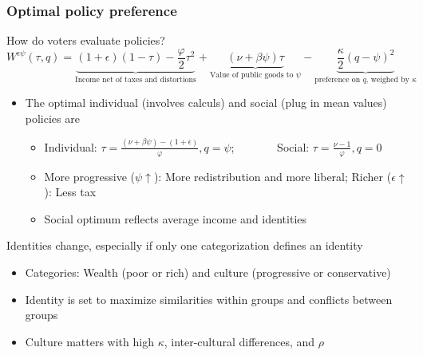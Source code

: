 \documentclass[aspectratio=169]{beamer}
\begin{document}
\begin{frame}
\frametitle{Optimal policy preference} 

How do voters evaluate policies?
\[
W^{\epsilon\psi}(\tau,q)=\underbrace{(1+\epsilon)(1-\tau)-\frac{\varphi}{2}\tau^2}_{\text{Income net of taxes and distortions}}+\underbrace{(\nu+\beta\psi)\tau}_{\text{Value of public goods to $\psi$}}-\underbrace{\frac{\kappa}{2}(q-\psi)^2}_{\text{preference on $q$, weighed by $\kappa$}}
\]
\begin{itemize}\setlength\itemsep{3pt}
\item The optimal individual (involves calculs) and social (plug in mean values) policies are 
\begin{itemize}\setlength\itemsep{3pt}
\item Individual: $\tau=\frac{(\nu+\beta\psi)-(1+\epsilon)}{\varphi}, q=\psi$; \ \ \ \  \ \ \    Social: $\tau=\frac{\nu-1}{\varphi}, q=0$
\item More progressive ($\psi\uparrow$): More redistribution and more liberal; Richer ($\epsilon\uparrow$): Less tax
\item Social optimum reflects average income and identities
\end{itemize}
\end{itemize}\medskip
Identities change, especially if only one categorization defines an identity
\begin{itemize}\setlength\itemsep{3pt}
\item Categories: Wealth (poor or rich) and culture (progressive or conservative)
\item Identity is set to maximize similarities within groups and conflicts between groups
\item Culture matters with high $\kappa$, inter-cultural differences, and $\rho$
\end{itemize}
\end{frame}
\end{document}
